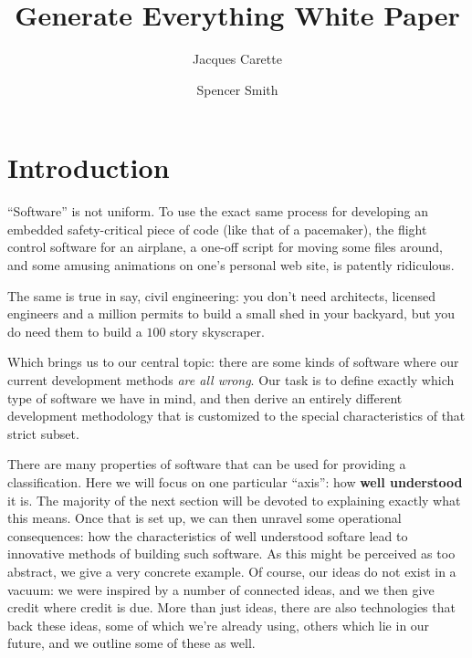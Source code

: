 \documentclass[10pt,twoside,onecolumn,openany,letterpaper]{memoir}
\begin{document}
\title{Generate Everything White Paper}
\author{Jacques Carette \and Spencer Smith}



\newtheorem{defn}{Definition}

\maketitle

\chapter{Introduction}

``Software'' is not uniform. To use the exact same process for
developing an embedded safety-critical piece of code (like that of
a pacemaker), the flight control software for an airplane, a one-off
script for moving some files around, and some amusing animations on
one's personal web site, is patently ridiculous.

The same is true in say, civil engineering: you don't need architects,
licensed engineers and a million permits to build a small shed in your
backyard, but you do need them to build a $100$ story skyscraper.

Which brings us to our central topic: there are some kinds of software
where our current development methods \emph{are all wrong}. Our task
is to define exactly which type of software we have in mind, and then
derive an entirely different development methodology that is
customized to the special characteristics of that strict subset.

There are many properties of software that can be used for providing
a classification. Here we will focus on one particular ``axis'': how
\textbf{well understood} it is. The majority of the next section will
be devoted to explaining exactly what this means. Once that is set up,
we can then unravel some operational consequences: how the characteristics of
well understood softare lead to innovative methods of building such
software. As this might be perceived as too abstract, we give a very
concrete example. Of course, our ideas do not exist in a vacuum: we were
inspired by a number of connected ideas, and we then give credit where
credit is due. More than just ideas, there are also technologies that back
these ideas, some of which we're already using, others which lie in our
future, and we outline some of these as well. %
\end{document}
